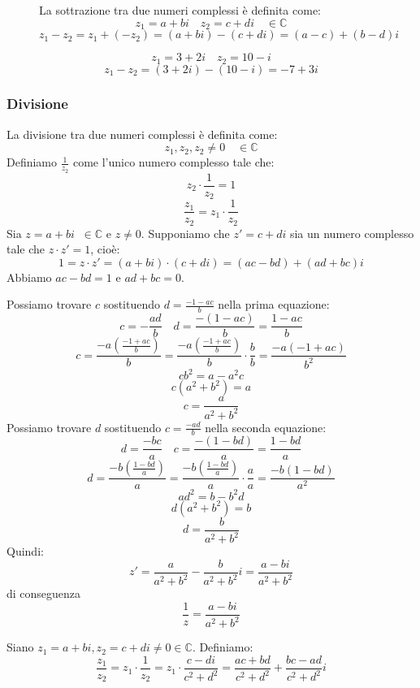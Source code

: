 \documentclass[a4paper]{article}
\theoremstyle{break}
\theoremstyle{break}
\theoremstyle{break}
\theoremstyle{break}
\begin{document}
\begin{figure}[H]
  \begin{definition}
    La sottrazione tra due numeri complessi è definita come:
    \[
      z_1 = a + bi \quad z_2 = c + di \quad \in \mathbb{C}
    \]
    \[
      z_1 - z_2 = z_1 + (-z_2) = (a + bi) - (c + di) = (a - c) + (b - d)i
    \]
  \end{definition}

  \begin{example}
    \[
      z_1 = 3 + 2i \quad z_2 = 10 - i
    \]
    \[
      z_1 - z_2 = (3 + 2i) - (10 - i) = -7 + 3i
    \]
  \end{example}
\end{figure}

\subsubsection{Divisione}
\begin{definition}
  La divisione tra due numeri complessi è definita come:
  \[
    z_1, z_2, z_2 \neq 0 \quad \in \mathbb{C}
  \]
  Definiamo \( \frac{1}{z_2} \) come l'unico numero complesso tale che:
  \[
    z_2 \cdot \frac{1}{z_2} = 1
  \]
  \[
    \frac{z_1}{z_2} = z_1 \cdot \frac{1}{z_2}
  \]
  Sia \( z = a + bi\;\; \in \mathbb{C} \) e \( z \neq 0 \). Supponiamo che \( z'= c + di \) sia
  un numero complesso tale che \( z \cdot z' = 1 \), cioè:
  \[
    1 = z \cdot z' = (a + bi) \cdot (c + di) = (ac - bd) + (ad + bc)i
  \]
  Abbiamo \( ac-bd=1 \) e \( ad+bc=0 \).

  \noindent Possiamo trovare \( c \) sostituendo \( d = \frac{-1-ac}{b} \) nella prima equazione:
  \[
    c = -\frac{ad}{b} \quad d = \frac{-(1-ac)}{b} = \frac{1-ac}{b}
  \]
  \[
    c = \frac{-a (\frac{-1+ac}{b})}{b} = \frac{-a (\frac{-1+ac}{b})}{b} \cdot \frac{b}{b} = \frac{-a (-1 + ac)}{b^2}
  \]
  \[
    cb^2 = a - a^2c
  \]
  \[
    c(a^2 + b^2) = a
  \]
  \[
    c = \frac{a}{a^2 + b^2}
  \]
  \noindent Possiamo trovare \( d \) sostituendo \( c = \frac{-ad}{b} \) nella seconda equazione:
  \[
    d = \frac{-bc}{a} \quad c = \frac{-(1-bd)}{a} = \frac{1-bd}{a}
  \]
  \[
    d = \frac{-b (\frac{1-bd}{a})}{a} = \frac{-b (\frac{1-bd}{a})}{a} \cdot \frac{a}{a} = \frac{-b (1 - bd)}{a^2}
  \]
  \[
    ad^2 = b - b^2d
  \]
  \[
    d(a^2 + b^2) = b
  \]
  \[
    d = \frac{b}{a^2 + b^2}
  \]
  Quindi:
  \[
    z' = \frac{a}{a^2 + b^2} - \frac{b}{a^2 + b^2}i = \frac{a - bi}{a^2 + b^2}
  \]
  di conseguenza \[ \frac{1}{z} = \frac{a-bi}{a^2+b^2} \]

  \noindent Siano \( z_1 = a+bi, z_2 = c+di \neq 0 \in \mathbb{C} \). Definiamo:
  \[
    \frac{z_1}{z_2} = z_1 \cdot \frac{1}{z_2} = z_1 \cdot \frac{c-di}{c^2+d^2} = \frac{ac+bd}{c^2+d^2} + \frac{bc-ad}{c^2+d^2}i
  \]
\end{definition}
\end{document}
